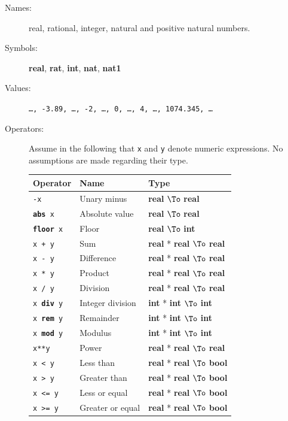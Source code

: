 \documentclass{overturerepchap}
\newcommand{\keyw}[1]{{\bf\ttfamily #1}}
\newcommand{\PROD}[2]{#1 * #2}
\newcommand{\TO}[2]{#1 $\To$ #2}
\begin{document}
\begin{description}
\item[Names:] real, rational, integer, natural and positive natural
  numbers.
\item[Symbols:] \keyw{real}, \keyw{rat}, \keyw{int}, \keyw{nat},
  \keyw{nat1}
\item[Values:] {\tt \ldots, -3.89, \ldots, -2, \ldots, 0, \ldots, 4,
    \ldots, 1074.345, \ldots}
\item[Operators:] Assume in the following that {\tt x} and {\tt y} denote
  numeric expressions. No assumptions are made regarding their type.

  \begin{tabular}{|l|l|l|}\hline
    Operator       & Name & Type \\ \hline
    {\tt -x}& Unary minus & \TO{\keyw{real}}{\keyw{real}} \\
    {\tt \keyw{abs} x}& Absolute value & \TO{\keyw{real}}{\keyw{real}} \\
    {\tt \keyw{floor} x}& Floor  & \TO{\keyw{real}}{\keyw{int}} \\
    {\tt x + y}& Sum    & \TO{\PROD{\keyw{real}}{\keyw{real}}}{\keyw{real}} \\
    {\tt x - y}& Difference & \TO{\PROD{\keyw{real}}{\keyw{real}}}{\keyw{real}} \\
    {\tt x * y}& Product  & \TO{\PROD{\keyw{real}}{\keyw{real}}}{\keyw{real}} \\
    {\tt x / y}& Division & \TO{\PROD{\keyw{real}}{\keyw{real}}}{\keyw{real}} \\
    {\tt x \keyw{div} y}& Integer division & \TO{\PROD{\keyw{int}}{\keyw{int}}}{\keyw{int}} \\
    {\tt x \keyw{rem} y}& Remainder & \TO{\PROD{\keyw{int}}{\keyw{int}}}{\keyw{int}} \\
    {\tt x \keyw{mod} y}& Modulus   & \TO{\PROD{\keyw{int}}{\keyw{int}}}{\keyw{int}} \\
    {\tt x**y}& Power & \TO{\PROD{\keyw{real}}{\keyw{real}}}{\keyw{real}} \\
    {\tt x < y}& Less than & \TO{\PROD{\keyw{real}}{\keyw{real}}}{\keyw{bool}} \\
    {\tt x > y}& Greater than & \TO{\PROD{\keyw{real}}{\keyw{real}}}{\keyw{bool}} \\
    {\tt x <= y}& Less or equal & \TO{\PROD{\keyw{real}}{\keyw{real}}}{\keyw{bool}} \\
    {\tt x >= y}& Greater or equal & \TO{\PROD{\keyw{real}}{\keyw{real}}}{\keyw{bool}} \\

\end{tabular}
\end{description}
\end{document}
